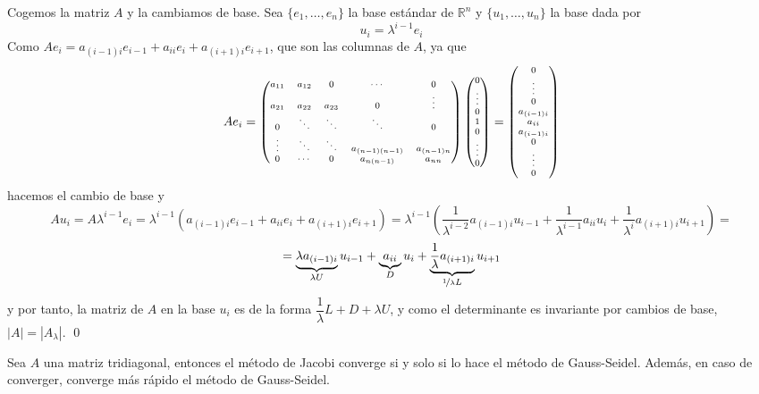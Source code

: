     \begin{dem}
        Cogemos la matriz $A$ y la cambiamos de base. Sea $\{e_1,\ldots,e_n\}$ la base estándar de $\mathbb R^n$ y $\{u_1, \ldots, u_n\}$ la base dada por 
        $$u_i=\lambda^{i-1} e_i$$
        Como $Ae_i=a_{(i-1)i}e_{i-1}+a_{ii}e_i+a_{(i+1)i}e_{i+1}$, que son las columnas de $A$, ya que
        $$Ae_i=\scriptsize{\begin{pmatrix}
            a_{11} & a_{12} & 0 & \cdots & 0 \\
            a_{21} & a_{22} & a_{23} & 0 & \vdots \\
            0 & \ddots & \ddots & \ddots & 0\\
            \vdots & \ddots &\ddots & a_{(n-1)(n-1)}& a_{(n-1)n} \\
            0 & \cdots  & 0 & a_{n(n-1)} & a_{nn}
        \end{pmatrix} \begin{pmatrix}
            0 \\ \vdots \\ 0 \\ 1 \\ 0 \\ \vdots \\ 0 
        \end{pmatrix}= \begin{pmatrix}
            0 \\ \vdots \\ 0 \\ a_{(i-1)i} \\ a_{ii} \\ a_{(i-1)i} \\ 0 \\ \vdots \\ 0 
        \end{pmatrix}}$$
        hacemos el cambio de base y
        $$Au_i=A\lambda^{i-1} e_i=\lambda^{i-1} (a_{(i-1)i}e_{i-1}+a_{ii}e_i+a_{(i+1)i}e_{i+1}) =\lambda^{i-1} \left( \dfrac{1}{\lambda^{i-2}} a_{(i-1)i}u_{i-1}+\dfrac{1}{\lambda^{i-1}}a_{ii}u_i+\dfrac{1}{\lambda^{i}}a_{(i+1)i}u_{i+1}\right)=$$
        $$=\underbrace{\lambda a_{(i-1)i}}_{\lambda U}u_{i-1} + \underbrace{a_{ii}}_{D}u_i+\underbrace{\dfrac{1}{\lambda}a_{(i+1)i}}_{\nicefrac{1}{\lambda}L} u_{i+1}$$
        y por tanto, la matriz de $A$ en la base $u_i$ es de la forma $\dfrac{1}{\lambda}L + D +\lambda U$, y como el determinante es invariante por cambios de base, $|A|=|A_{\lambda}|$.
    \qed\end{dem}
    \begin{prop}
        Sea $A$ una matriz tridiagonal, entonces el método de Jacobi converge si y solo si lo hace el método de Gauss-Seidel. Además, en caso de converger, converge más rápido el método de Gauss-Seidel.
    \end{prop}
